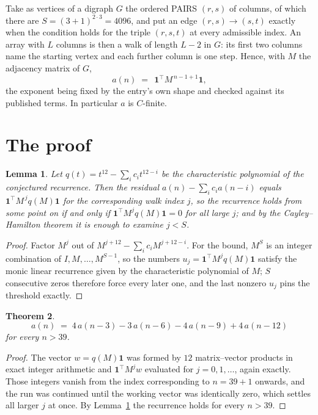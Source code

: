 \documentclass[11pt,a4paper]{article}
\theoremstyle{plain}
\newtheorem{theorem}{Theorem}
\newtheorem{lemma}[theorem]{Lemma}
\theoremstyle{definition}
\begin{document}
Take as vertices of a digraph $G$ the ordered PAIRS $(r,s)$ of columns, of which there are
$S=(3+1)^{2\cdot3}=4096$, and put an edge $(r,s)\to(s,t)$ exactly when the condition
holds for the triple $(r,s,t)$ at every admissible index. An array with $L$ columns is then a
walk of length $L-2$ in $G$: its first two columns name the starting vertex and each further
column is one step. Hence, with $M$ the adjacency matrix of $G$,
\[
a(n)\;=\;\,\mathbf{1}^{\!\top}M^{\,n-1+1}\mathbf{1},
\]
the exponent being fixed by the entry's own shape and checked against its published terms.
In particular $a$ is $C$-finite.

\section{The proof}

\begin{lemma}\label{lem:crit}
Let $q(t)=t^{12}-\sum_i c_it^{12-i}$ be the characteristic polynomial of the
conjectured recurrence. Then the residual $a(n)-\sum_ic_ia(n-i)$ equals
$\mathbf{1}^{\!\top}M^{\,j}q(M)\mathbf{1}$ for the corresponding walk index
$j$, so the recurrence holds from some point on if and only if
$\mathbf{1}^{\!\top}M^{j}q(M)\mathbf{1}=0$ for all large $j$; and by the
Cayley--Hamilton theorem it is enough to examine $j<S$.
\end{lemma}

\begin{proof}
Factor $M^{j}$ out of $M^{j+12}-\sum_ic_iM^{j+12-i}$. For the bound, $M^{S}$
is an integer combination of $I,M,\dots,M^{S-1}$, so the numbers
$u_j=\mathbf{1}^{\!\top}M^{j}q(M)\mathbf{1}$ satisfy the monic linear recurrence given by
the characteristic polynomial of $M$; $S$ consecutive zeros therefore force every later one,
and the last nonzero $u_j$ pins the threshold exactly.
\end{proof}

\begin{theorem}
\[
a(n)\;=\;4\,a(n-3) - 3\,a(n-6) - 4\,a(n-9) + 4\,a(n-12)
\]
for every $n>39$.
\end{theorem}

\begin{proof}
The vector $w=q(M)\mathbf{1}$ was formed by $12$ matrix--vector products in exact
integer arithmetic and $\mathbf{1}^{\!\top}M^{j}w$ evaluated for $j=0,1,\dots$, again
exactly. Those integers vanish from the index corresponding to $n=39+1$ onwards, and the
run was continued until the working vector was identically zero, which settles all larger $j$
at once. By Lemma~\ref{lem:crit} the recurrence holds for every $n>39$.
\end{proof}
\end{document}
